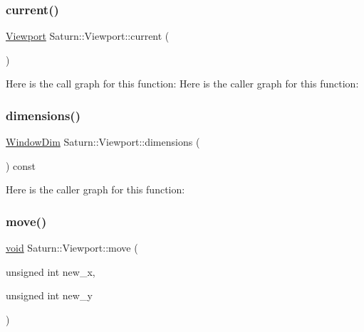 \subsubsection{\texorpdfstring{current()}{current()}}
{\footnotesize\ttfamily \mbox{\hyperlink{class_saturn_1_1_viewport}{Viewport}} Saturn\+::\+Viewport\+::current (\begin{DoxyParamCaption}{ }\end{DoxyParamCaption})\hspace{0.3cm}{\ttfamily [static]}}

Here is the call graph for this function\+:
Here is the caller graph for this function\+:
\mbox{\label{class_saturn_1_1_viewport_a37810a2ffacf7d4698e900865559a1a9}} 
\subsubsection{\texorpdfstring{dimensions()}{dimensions()}}
{\footnotesize\ttfamily \mbox{\hyperlink{namespace_saturn_a606451fdad804aef3b4f56f6805900f2}{Window\+Dim}} Saturn\+::\+Viewport\+::dimensions (\begin{DoxyParamCaption}{ }\end{DoxyParamCaption}) const}

Here is the caller graph for this function\+:
\mbox{\label{class_saturn_1_1_viewport_a1cfa8d2a150c4ceb45937449fa6f4455}} 
\subsubsection{\texorpdfstring{move()}{move()}}
{\footnotesize\ttfamily \mbox{\hyperlink{glad_8h_a950fc91edb4504f62f1c577bf4727c29}{void}} Saturn\+::\+Viewport\+::move (\begin{DoxyParamCaption}\item[{unsigned int}]{new\+\_\+x,  }\item[{unsigned int}]{new\+\_\+y }\end{DoxyParamCaption})}

\mbox{\label{class_saturn_1_1_viewport_ae430a90f83a57f04e75e6e8be9a97cfb}} 
